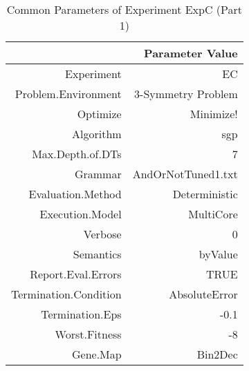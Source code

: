 \begin{table}[ht]
\centering
\begin{tabular}{rr}
  \hline
 & Parameter Value \\ 
  \hline
Experiment & EC \\ 
  Problem.Environment & 3-Symmetry Problem \\ 
  Optimize & Minimize! \\ 
  Algorithm & sgp \\ 
  Max.Depth.of.DTs & 7 \\ 
  Grammar & AndOrNotTuned1.txt \\ 
  Evaluation.Method & Deterministic \\ 
  Execution.Model & MultiCore \\ 
  Verbose & 0 \\ 
  Semantics & byValue \\ 
  Report.Eval.Errors & TRUE \\ 
  Termination.Condition & AbsoluteError \\ 
  Termination.Eps & -0.1 \\ 
  Worst.Fitness & -8 \\ 
  Gene.Map & Bin2Dec \\ 
   \hline
\end{tabular}
\caption{Common Parameters of Experiment ExpC (Part 1)} 
\end{table}
